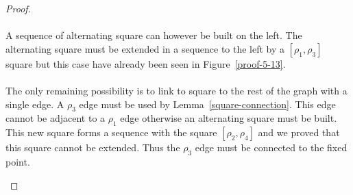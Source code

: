 \begin{proof}
\paragraph{}
A sequence of alternating square can however be built on the left. The alternating square must be extended in a sequence to the left by a $[\rho_1, \rho_3]$ square but this case have already been seen in Figure~\ref{proof-5-13}.

\paragraph{}
The only remaining possibility is to link to square to the rest of the graph with a single edge. A $\rho_3$ edge must be used by Lemma~\ref{square-connection}. This edge cannot be adjacent to a $\rho_1$ edge otherwise an alternating square must be built. This new square forms a sequence with the square $[\rho_2, \rho_4]$ and we proved that this square cannot be extended. Thus the $\rho_3$ edge must be connected to the fixed point.

\begin{figure}[H]
  \begin{center}
\end{center}
\end{figure}
\end{proof}
